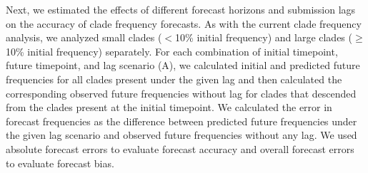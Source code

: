 \documentclass[9pt,lineno]{elife}
\begin{document}
Next, we estimated the effects of different forecast horizons and submission lags on the accuracy of clade frequency forecasts.
As with the current clade frequency analysis, we analyzed small clades ($<$10\% initial frequency) and large clades ($\ge$10\% initial frequency) separately.
For each combination of initial timepoint, future timepoint, and lag scenario (A), we calculated initial and predicted future frequencies for all clades present under the given lag and then calculated the corresponding observed future frequencies without lag for clades that descended from the clades present at the initial timepoint.
We calculated the error in forecast frequencies as the difference between predicted future frequencies under the given lag scenario and observed future frequencies without any lag.
We used absolute forecast errors to evaluate forecast accuracy and overall forecast errors to evaluate forecast bias.
\end{document}
